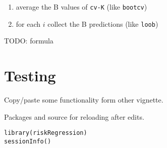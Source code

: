 \documentclass{article}
\begin{document}
\begin{enumerate}
\item average the B values of \texttt{cv-K} (like \texttt{bootcv})
\item for each \(i\) collect the B predictions (like \texttt{loob})
\end{enumerate}

TODO: formula

\section{Testing}
\label{sec:orgf94a3e2}
Copy/paste some functionality form other vignette.

Packages and source for reloading after edits.
\lstset{language=r,label= ,caption= ,captionpos=b,numbers=none}
\begin{lstlisting}
library(riskRegression)
sessionInfo()
\end{lstlisting}
\end{document}
